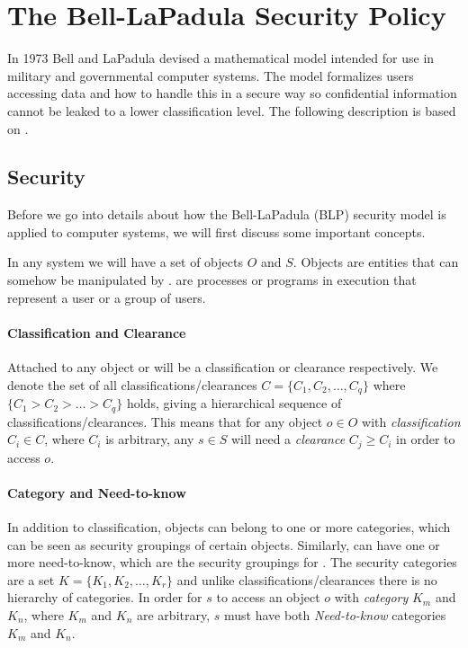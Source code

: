 \section{The Bell-LaPadula Security Policy}

In 1973 Bell and LaPadula devised a mathematical model intended for use in  military and governmental computer systems.
The model formalizes users accessing data and how to handle this in a secure way so confidential information cannot be leaked to a lower classification level.
The following description is based on \citet{lapadula1996secure}.

\subsection{Security}
Before we go into details about how the Bell-LaPadula (BLP) security model is applied to computer systems, we will first discuss some important concepts.

In any system we will have a set of objects $O$ and \subjects{} $S$.
Objects are entities that can somehow be manipulated by \subjects{}.
\Subjects{} are processes or programs in execution that represent a user or a group of users.

\paragraph{Classification and Clearance}
Attached to any object or \ssubject{} will be a classification or clearance respectively.
We denote the set of all classifications/clearances $C = \{C_1, C_2,\dots,C_q\}$ where $\{C_1 > C_2 > \dots > C_q\}$ holds, giving a hierarchical sequence of classifications/clearances.
This means that for any object $o \in O$ with \textit{classification} $C_i \in C$, where $C_i$ is arbitrary, any \ssubject{} $s \in S$ will need a \textit{clearance} $C_j \geq C_i$ in order to access $o$.

\paragraph{Category and Need-to-know}
In addition to classification, objects can belong to one or more categories, which can be seen as security groupings of certain objects.
Similarly, \subjects{} can have one or more need-to-know, which are the security groupings for \subjects{}.
The security categories are a set $K = \{K_1, K_2, \dots, K_r\}$ and unlike classifications/clearances there is no hierarchy of categories.
In order for \ssubject{} $s$ to access an object $o$ with \textit{category} $K_m$ and $K_n$, where $K_m$ and $K_n$ are arbitrary, $s$ must have both \textit{Need-to-know} categories $K_m$ and $K_n$.

